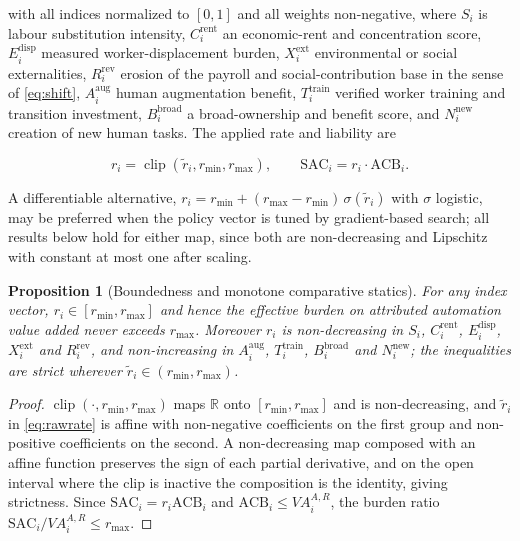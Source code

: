 \documentclass[journal]{IEEEtran}
\theoremstyle{plain}
\newtheorem{proposition}{Proposition}
\theoremstyle{definition}
\newcommand{\ACB}{\mathrm{ACB}}
\newcommand{\SAC}{\mathrm{SAC}}
\newcommand{\clip}{\operatorname{clip}}
\begin{document}
with all indices normalized to $[0,1]$ and all weights non-negative, where $S_i$ is labour substitution intensity, $C^{\mathrm{rent}}_i$ an economic-rent and concentration score, $E^{\mathrm{disp}}_i$ measured worker-displacement burden, $X^{\mathrm{ext}}_i$ environmental or social externalities, $R^{\mathrm{rev}}_i$ erosion of the payroll and social-contribution base in the sense of \eqref{eq:shift}, $A^{\mathrm{aug}}_i$ human augmentation benefit, $T^{\mathrm{train}}_i$ verified worker training and transition investment, $B^{\mathrm{broad}}_i$ a broad-ownership and benefit score, and $N^{\mathrm{new}}_i$ creation of new human tasks. The applied rate and liability are

\begin{equation}
\label{eq:rate}
r_i = \clip(\tilde r_i, r_{\min}, r_{\max}), \qquad \SAC_i = r_i \cdot \ACB_i .
\end{equation}

A differentiable alternative, $r_i = r_{\min} + (r_{\max}-r_{\min})\,\sigma(\tilde r_i)$ with $\sigma$ logistic, may be preferred when the policy vector is tuned by gradient-based search; all results below hold for either map, since both are non-decreasing and Lipschitz with constant at most one after scaling.

\begin{proposition}[Boundedness and monotone comparative statics]
\label{prop:bounded}
For any index vector, $r_i\in[r_{\min},r_{\max}]$ and hence the effective burden on attributed automation value added never exceeds $r_{\max}$. Moreover $r_i$ is non-decreasing in $S_i$, $C^{\mathrm{rent}}_i$, $E^{\mathrm{disp}}_i$, $X^{\mathrm{ext}}_i$ and $R^{\mathrm{rev}}_i$, and non-increasing in $A^{\mathrm{aug}}_i$, $T^{\mathrm{train}}_i$, $B^{\mathrm{broad}}_i$ and $N^{\mathrm{new}}_i$; the inequalities are strict wherever $\tilde r_i\in(r_{\min},r_{\max})$.
\end{proposition}

\begin{proof}
$\clip(\cdot,r_{\min},r_{\max})$ maps $\mathbb{R}$ onto $[r_{\min},r_{\max}]$ and is non-decreasing, and $\tilde r_i$ in \eqref{eq:rawrate} is affine with non-negative coefficients on the first group and non-positive coefficients on the second. A non-decreasing map composed with an affine function preserves the sign of each partial derivative, and on the open interval where the clip is inactive the composition is the identity, giving strictness. Since $\SAC_i = r_i \ACB_i$ and $\ACB_i \le VA^{A,R}_i$, the burden ratio $\SAC_i/VA^{A,R}_i \le r_{\max}$.
\end{proof}
\end{document}
